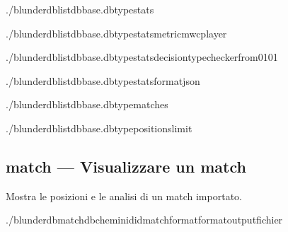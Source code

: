 \documentclass[letterpaper,10pt,italian]{sphinxmanual}
\begin{document}
\begin{sphinxVerbatim}[commandchars=\\\{\}]
./blunderdblist\PYGZhy{}\PYGZhy{}dbbase.db\PYGZhy{}\PYGZhy{}typestats

./blunderdblist\PYGZhy{}\PYGZhy{}dbbase.db\PYGZhy{}\PYGZhy{}typestats\PYGZhy{}\PYGZhy{}metricmwc\PYGZhy{}\PYGZhy{}player

./blunderdblist\PYGZhy{}\PYGZhy{}dbbase.db\PYGZhy{}\PYGZhy{}typestats\PYGZhy{}\PYGZhy{}decision\PYGZhy{}typechecker\PYGZhy{}\PYGZhy{}from\PYGZhy{}01\PYGZhy{}01

./blunderdblist\PYGZhy{}\PYGZhy{}dbbase.db\PYGZhy{}\PYGZhy{}typestats\PYGZhy{}\PYGZhy{}formatjson

./blunderdblist\PYGZhy{}\PYGZhy{}dbbase.db\PYGZhy{}\PYGZhy{}typematches

./blunderdblist\PYGZhy{}\PYGZhy{}dbbase.db\PYGZhy{}\PYGZhy{}typepositions\PYGZhy{}\PYGZhy{}limit
\end{sphinxVerbatim}


\subsection{match — Visualizzare un match}
\label{\detokenize{cli:match-afficher-un-match}}
\sphinxAtStartPar
Mostra le posizioni e le analisi di un match importato.

\begin{sphinxVerbatim}[commandchars=\\\{\}]
./blunderdbmatch\PYGZhy{}\PYGZhy{}db\PYGZlt{}chemin\PYGZgt{}\PYGZhy{}\PYGZhy{}id\PYGZlt{}id\PYGZus{}match\PYGZgt{}\PYG{o}{[}\PYGZhy{}\PYGZhy{}format\PYGZlt{}format\PYGZgt{}\PYG{o}{]}\PYG{o}{[}\PYGZhy{}\PYGZhy{}output\PYGZlt{}fichier\PYGZgt{}\PYG{o}{]}
\end{sphinxVerbatim}
\end{document}
